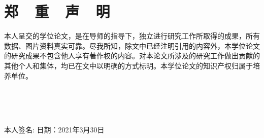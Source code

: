 \section*{\bfseries{\songti 郑\ \ 重\ \ 声\ \ 明}}

\thispagestyle{fancy}
\lhead{}
\rhead{}
\fancyfoot{}

{\songti 本人呈交的学位论文，是在导师的指导下，独立进行研究工作所取得的成果，所有数据、图片资料真实可靠。尽我所知，除文中已经注明引用的内容外，本学位论文的研究成果不包含他人享有著作权的内容。对本论文所涉及的研究工作做出贡献的其他个人和集体，均已在文中以明确的方式标明。本学位论文的知识产权归属于培养单位。\par
 \hspace*{\fill} \\
 \hspace*{\fill} \\
 \hspace*{\fill} \\
 \hspace*{\fill} \par
本人签名:  日期：2021年3月30日
\par
}
\cleardoublepage


